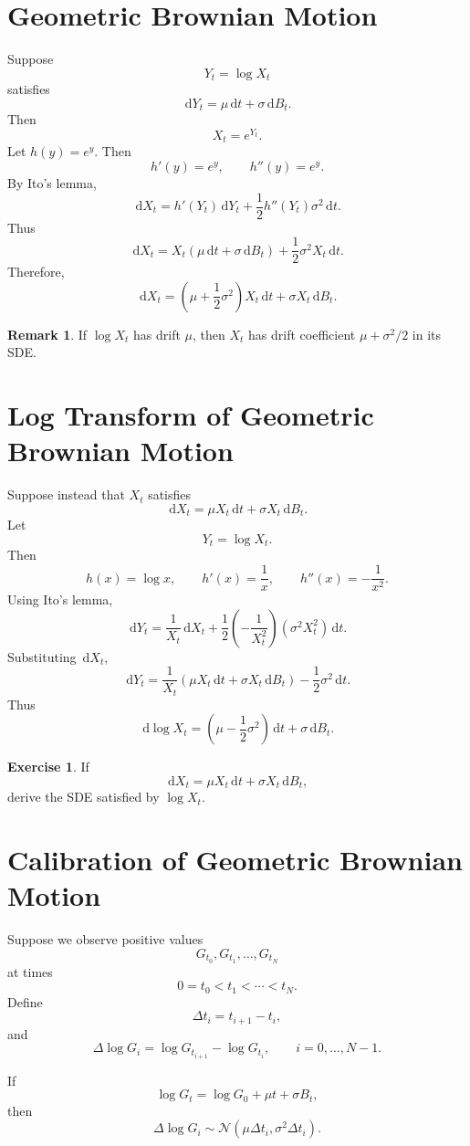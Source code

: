\documentclass[12pt,oneside]{book}
\numberwithin{equation}{section}
\theoremstyle{definition}
\newtheorem{exercise}{Exercise}[section]
\newtheorem{remark}{Remark}[section]
\theoremstyle{plain}
\theoremstyle{remark}
\newcommand{\dd}{\,\mathrm{d}}
\newcommand{\Normal}{\mathcal{N}}
\begin{document}
\section{Geometric Brownian Motion}

Suppose
\[
Y_t=\log X_t
\]
satisfies
\[
\dd Y_t=\mu\dd t+\sigma\dd B_t.
\]
Then
\[
X_t=e^{Y_t}.
\]
Let $h(y)=e^y$. Then
\[
h'(y)=e^y,
\qquad
h''(y)=e^y.
\]
By Ito's lemma,
\[
\dd X_t
=
h'(Y_t)\dd Y_t
+
\frac{1}{2}h''(Y_t)\sigma^2\dd t.
\]
Thus
\[
\dd X_t
=
X_t(\mu\dd t+\sigma\dd B_t)
+
\frac{1}{2}\sigma^2X_t\dd t.
\]
Therefore,
\[
\dd X_t
=
\left(\mu+\frac{1}{2}\sigma^2\right)X_t\dd t
+
\sigma X_t\dd B_t.
\]

\begin{remark}
If $\log X_t$ has drift $\mu$, then $X_t$ has drift coefficient $\mu+\sigma^2/2$ in its SDE.
\end{remark}

\section{Log Transform of Geometric Brownian Motion}

Suppose instead that $X_t$ satisfies
\[
\dd X_t=\mu X_t\dd t+\sigma X_t\dd B_t.
\]
Let
\[
Y_t=\log X_t.
\]
Then
\[
h(x)=\log x,
\qquad
h'(x)=\frac{1}{x},
\qquad
h''(x)=-\frac{1}{x^2}.
\]
Using Ito's lemma,
\[
\dd Y_t
=
\frac{1}{X_t}\dd X_t
+
\frac{1}{2}\left(-\frac{1}{X_t^2}\right)(\sigma^2X_t^2)\dd t.
\]
Substituting $\dd X_t$,
\[
\dd Y_t
=
\frac{1}{X_t}(\mu X_t\dd t+\sigma X_t\dd B_t)
-
\frac{1}{2}\sigma^2\dd t.
\]
Thus
\[
\dd \log X_t
=
\left(\mu-\frac{1}{2}\sigma^2\right)\dd t
+
\sigma\dd B_t.
\]

\begin{exercise}
If
\[
\dd X_t=\mu X_t\dd t+\sigma X_t\dd B_t,
\]
derive the SDE satisfied by $\log X_t$.
\end{exercise}

\section{Calibration of Geometric Brownian Motion}

Suppose we observe positive values
\[
G_{t_0},G_{t_1},\ldots,G_{t_N}
\]
at times
\[
0=t_0<t_1<\cdots<t_N.
\]
Define
\[
\Delta t_i=t_{i+1}-t_i,
\]
and
\[
\Delta \log G_i=\log G_{t_{i+1}}-\log G_{t_i},
\qquad
i=0,\ldots,N-1.
\]

If
\[
\log G_t=\log G_0+\mu t+\sigma B_t,
\]
then
\[
\Delta \log G_i
\sim
\Normal(\mu\Delta t_i,\sigma^2\Delta t_i).
\]
\end{document}
